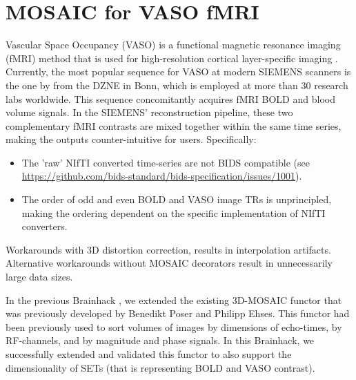 \documentclass[../main.tex]{subfiles}
\begin{document}
\section{MOSAIC for VASO fMRI} 



Vascular Space Occupancy (VASO) is a functional magnetic resonance imaging (fMRI) method that is used for high-resolution cortical layer-specific imaging \parencite{Huber2021a}. Currently, the most popular sequence for VASO at modern SIEMENS scanners is the one by \textcite{Stirnberg2021a} from the DZNE in Bonn, which is employed at more than 30 research labs worldwide. This sequence concomitantly acquires fMRI BOLD and blood volume signals. In the SIEMENS' reconstruction pipeline, these two complementary fMRI contrasts are mixed together within the same time series, making the outputs counter-intuitive for users. Specifically:

\begin{itemize}
    \item The 'raw' NIfTI converted time-series are not BIDS compatible (see \href{https://github.com/bids-standard/bids-specification/issues/1001}{https://github.com/bids-standard/bids-specification/issues/1001}).
    
    \item The order of odd and even BOLD and VASO image TRs is unprincipled, making the ordering dependent on the specific implementation of NIfTI converters.
\end{itemize}

Workarounds with 3D distortion correction, results in interpolation artifacts. Alternative workarounds without MOSAIC decorators result in unnecessarily large data sizes.

In the previous Brainhack \parencite{Gau2021}, we extended the existing 3D-MOSAIC functor that was previously developed by Benedikt Poser and Philipp Ehses. This functor had been previously used to sort volumes of images by dimensions of echo-times, by RF-channels, and by magnitude and phase signals. In this Brainhack, we successfully extended and validated this functor to also support the dimensionality of SETs (that is representing BOLD and VASO contrast).
\end{document}
